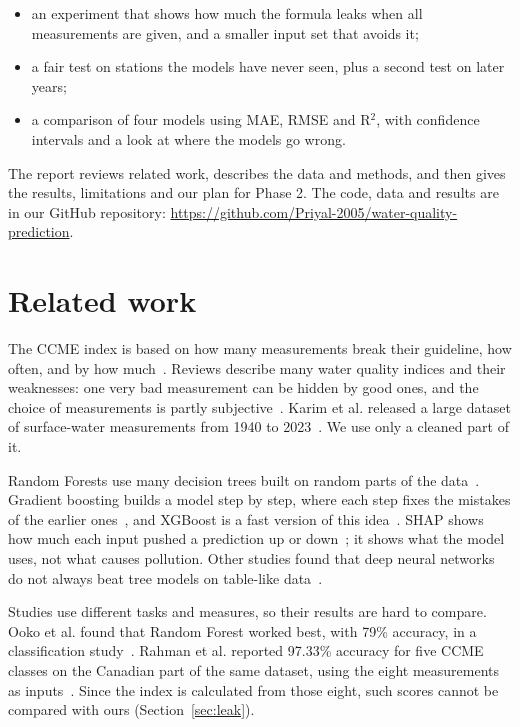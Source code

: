 \documentclass[conference]{IEEEtran}
\begin{document}
\begin{itemize}
\item an experiment that shows how much the formula leaks when all measurements are given, and a smaller input set that avoids it;
\item a fair test on stations the models have never seen, plus a second test on later years;
\item a comparison of four models using MAE, RMSE and R$^2$, with confidence intervals and a look at where the models go wrong.
\end{itemize}

The report reviews related work, describes the data and methods, and then gives the results, limitations and our plan for Phase 2. The code, data and results are in our GitHub repository: \url{https://github.com/Priyal-2005/water-quality-prediction}.


\section{Related work}
The CCME index is based on how many measurements break their guideline, how often, and by how much~\cite{ccme2001}. Reviews describe many water quality indices and their weaknesses: one very bad measurement can be hidden by good ones, and the choice of measurements is partly subjective~\cite{syeed2023,chidiac2023}. Karim et al. released a large dataset of surface-water measurements from 1940 to 2023~\cite{karim2025}. We use only a cleaned part of it.

Random Forests use many decision trees built on random parts of the data~\cite{breiman2001}. Gradient boosting builds a model step by step, where each step fixes the mistakes of the earlier ones~\cite{friedman2001}, and XGBoost is a fast version of this idea~\cite{chen2016}. SHAP shows how much each input pushed a prediction up or down~\cite{lundberg2017}; it shows what the model uses, not what causes pollution. Other studies found that deep neural networks do not always beat tree models on table-like data~\cite{grinsztajn2022,shwartz2022}.

Studies use different tasks and measures, so their results are hard to compare. Ooko et al. found that Random Forest worked best, with 79\% accuracy, in a classification study~\cite{ooko2023}. Rahman et al. reported 97.33\% accuracy for five CCME classes on the Canadian part of the same dataset, using the eight measurements as inputs~\cite{rahman2026}. Since the index is calculated from those eight, such scores cannot be compared with ours (Section~\ref{sec:leak}).
\end{document}
